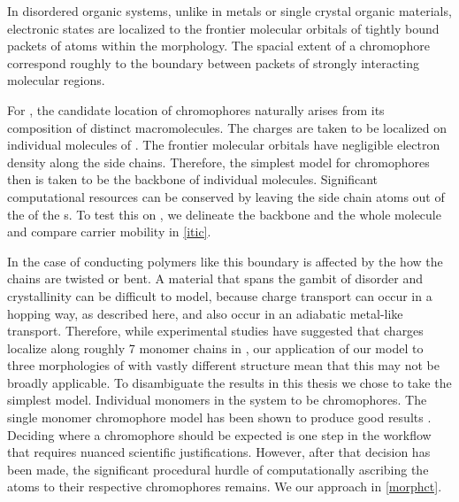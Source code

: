 In disordered organic systems, unlike in metals or single crystal organic materials, 
electronic states are localized to the frontier molecular orbitals of tightly
bound packets of atoms within the morphology. 
The spacial extent of a chromophore
correspond roughly to the boundary between packets of strongly interacting molecular regions.

For , the candidate location of chromophores naturally arises from its composition of distinct
macromolecules.
The charges are taken to be localized on individual molecules of . The frontier molecular orbitals have 
negligible electron density along the side chains. Therefore, the simplest model for chromophores then is
taken to be the backbone of individual molecules. Significant computational resources 
can be conserved by leaving the side chain atoms out of the of the s. 
To test this on , we delineate the backbone and the whole molecule and compare carrier mobility in \autoref{itic}.
 
In the case of conducting polymers like  this boundary is affected by the how the chains are twisted
or bent. A material that spans the gambit of disorder and crystallinity can be difficult to model, because
charge transport can occur in a hopping way, as described here, and also occur in an adiabatic metal-like transport. 
Therefore, while experimental studies have suggested that charges localize along roughly 7 monomer chains
in , our application of our model to three morphologies of  with vastly different structure mean 
that this may not be broadly applicable. To disambiguate the results in this thesis we chose to take the
simplest model. Individual monomers in the system to be chromophores. The single monomer chromophore model has been shown to
produce good results \cite{jones2017}.
Deciding where a chromophore should be expected is one step in the workflow that requires nuanced
scientific justifications. However, after that decision has been made, the significant procedural hurdle of 
computationally ascribing the atoms to their respective chromophores remains.
We our approach in \autoref{morphct}.

